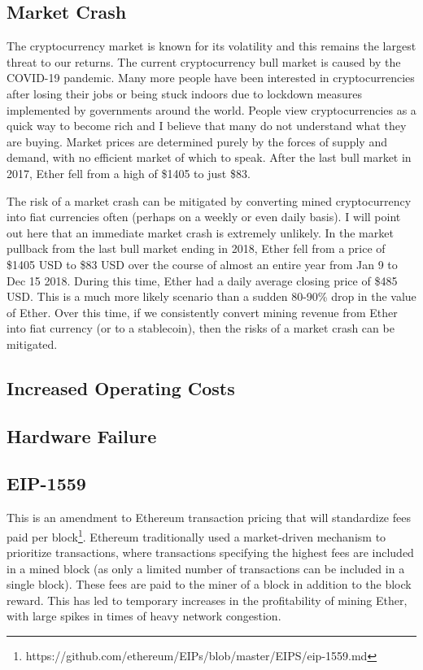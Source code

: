 \documentclass[a4paper,11pt]{article}
\begin{document}
\subsection{Market Crash}
\vspace{-10pt}
The cryptocurrency market is known for its volatility and this remains the largest threat to our returns. The current cryptocurrency bull market is caused by the COVID-19 pandemic. Many more people have been interested in cryptocurrencies after losing their jobs or being stuck indoors due to lockdown measures implemented by governments around the world. People view cryptocurrencies as a quick way to become rich and I believe that many do not understand what they are buying. Market prices are determined purely by the forces of supply and demand, with no efficient market of which to speak. After the last bull market in 2017, Ether fell from a high of \$1405 to just \$83.

The risk of a market crash can be mitigated by converting mined cryptocurrency into fiat currencies often (perhaps on a weekly or even daily basis). I will point out here that an immediate market crash is extremely unlikely. In the market pullback from the last bull market ending in 2018, Ether fell from a price of \$1405 USD to \$83 USD over the course of almost an entire year from Jan 9 to Dec 15 2018. During this time, Ether had a daily average closing price of \$485 USD. This is a much more likely scenario than a sudden 80-90\% drop in the value of Ether. Over this time, if we consistently convert mining revenue from Ether into fiat currency (or to a stablecoin), then the risks of a market crash can be mitigated.
\vspace{-10pt}

\subsection{Increased Operating Costs}
\subsection{Hardware Failure}
\subsection{EIP-1559}
\vspace{-10pt}
This is an amendment to Ethereum transaction pricing that will standardize fees paid per block\footnote{https://github.com/ethereum/EIPs/blob/master/EIPS/eip-1559.md}. Ethereum traditionally used a market-driven mechanism to prioritize transactions, where transactions specifying the highest fees are included in a mined block (as only a limited number of transactions can be included in a single block). These fees are paid to the miner of a block in addition to the block reward. This has led to temporary increases in the profitability of mining Ether, with large spikes in times of heavy network congestion. 
\end{document}
